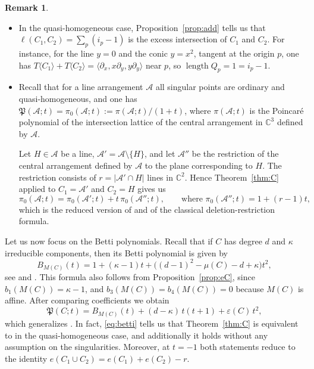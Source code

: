 \documentclass[11pt]{amsart}
\theoremstyle{definition}
\newtheorem{remark}[theorem]{Remark}
\numberwithin{equation}{section}
\newcommand{\CC}{\mathbb{C}}
\newcommand{\cA}{\mathcal{A}}
\newcommand{\Pfrak}{\mathfrak{P}}
\newcommand{\gadd}[1]{#1}
\DeclareMathOperator{\length}{length}
\begin{document}
\begin{remark}
\begin{itemize}
    \item In the quasi-homogeneous case, Proposition~\ref{prop:add} tells us that $\ell(C_1,C_2)=\sum_p(i_p-1)$ is the excess intersection of $C_1$ and $C_2$.
For instance, for the line $y=0$ and the conic $y=x^2$, tangent at the origin $p$, one has $T\langle C_1\rangle+T\langle C_2\rangle=\langle\partial_x,x\partial_y,y\partial_y\rangle$ near $p$, so $\length Q_p=1=i_p-1$.

\item Recall that for a line arrangement $\cA$ all singular points are ordinary and quasi-homogeneous, and one has $\Pfrak(\cA;t)=\pi_0(\cA;t):=\pi(\cA;t)/(1+t)$, where $\pi(\cA;t)$ is the Poincar\'e polynomial of the intersection lattice of the central arrangement in $\CC^3$ defined by $\cA$.

Let $H\in\cA$ be a line, $\cA'=\cA\setminus\{H\}$, and let $\cA''$ be the restriction of the central arrangement defined by $\cA$ to the plane corresponding to $H$. The restriction consists of $r=|\cA'\cap H|$ lines in $\CC^2$.
Hence Theorem~\ref{thm:C} applied to $C_1=\cA'$ and $C_2=H$ gives us
\[
\pi_0(\cA;t)=\pi_0(\cA';t)+t\,\pi_0(\cA'';t),\qquad\text{where }\pi_0(\cA'';t)=1+(r-1)t,
\]
which is the reduced version of \cite[Theorem~1.1]{Po24} and of the classical deletion-restriction formula.
\end{itemize}
\end{remark}

Let us now focus on the Betti polynomials. Recall that if $C$ has degree $d$ and $\gadd{\kappa}$ irreducible components, then its Betti polynomial is given by
\[
B_{M(C)}(t)=1+(\gadd{\kappa}-1)t+\bigl((d-1)^2-\mu(C)-d+\gadd{\kappa}\bigr)t^2,
\]
see \cite[Theorem~3.1]{Di25} and \cite{Po24}.
This formula also follows from Proposition~\ref{prop:eC}, since $b_1(M(C))=\gadd{\kappa}-1$, and $b_3(M(C))=b_4(M(C))=0$ because $M(C)$ is affine. After comparing coefficients we obtain
\begin{equation}\label{eq:betti}
\Pfrak(C;t)=B_{M(C)}(t)+(d-\gadd{\kappa})\,t(t+1)+\varepsilon(C)\,t^2 ,
\end{equation}
which generalizes \cite[(6)]{Po25}.
In fact, \eqref{eq:betti} tells us that Theorem~\ref{thm:C} is equivalent to \cite[Theorem~1.3]{Po24} in the quasi-homogeneous case, and additionally it holds without any assumption on the singularities. Moreover, at $t=-1$ both statements reduce to the identity $e(C_1\cup C_2)=e(C_1)+e(C_2)-r$.
\end{document}
